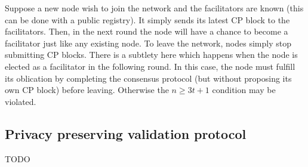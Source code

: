 Suppose a new node wish to join the network and the facilitators are known (this can be done with a public registry).
It simply sends its latest CP block to the facilitators.
Then, in the next round the node will have a chance to become a facilitator just like any existing node.
To leave the network, nodes simply stop submitting CP blocks.
There is a subtlety here which happens when the node is elected as a facilitator in the following round.
In this case, the node must fulfill its oblication by completing the consensus protocol (but without proposing its own CP block) before leaving.
Otherwise the $n \ge 3t + 1$ condition may be violated.

\subsection{Privacy preserving validation protocol}
TODO







